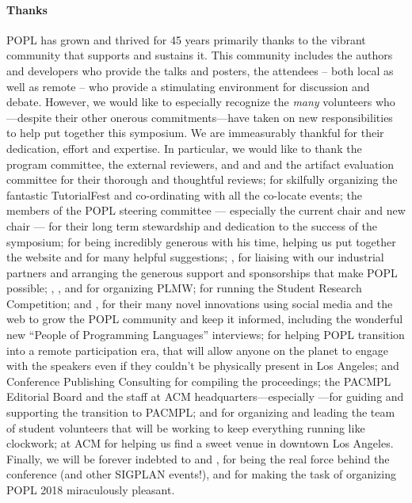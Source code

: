 \paragraph{Thanks}
%
POPL has grown and thrived for 45 years primarily thanks to
the vibrant community that supports and sustains it.
%
This community includes the authors and developers who
provide the talks and posters, the attendees -- both local
as well as remote -- who provide a stimulating environment
for discussion and debate.
%
However, we would like to especially recognize the \emph{many}
volunteers who---despite their other onerous commitments---have
taken on new responsibilities to help put together this symposium.
%
We are immeasurably thankful for their dedication, effort and expertise.
%
In particular, we would like to thank
%
the program committee, the external reviewers,
and  and 
and the artifact evaluation committee for their
thorough and thoughtful reviews;
%
 for skilfully organizing
the fantastic TutorialFest and co-ordinating with
all the co-locate events;
%
the members of the POPL steering committee --- especially the current
chair  and new chair  ---
for their long term stewardship and dedication to the success
of the symposium;
%
 for being incredibly generous with his time,
helping us put together the website and for many helpful
suggestions;
%
, for liaising with our industrial
partners and arranging the generous support and
sponsorships that make POPL possible;
%
, ,
 and 
for organizing PLMW;
%
 for running the Student Research Competition;
%
 and , for their many novel innovations
using social media and the web to grow the POPL community and
keep it informed, including the wonderful new ``People of Programming Languages''
interviews;
%
 for helping POPL transition into a remote participation
era, that will allow anyone on the planet to engage with the speakers even
if they couldn't be physically present in Los Angeles;
%
%
 and Conference Publishing Consulting
for compiling the proceedings;
%
the PACMPL Editorial Board and the staff at ACM
headquarters---especially ---for guiding
and supporting the transition to PACMPL;
%
 and  for organizing
and leading the team of student volunteers that will be
working to keep everything running like clockwork;
%
 at ACM for helping us find a sweet
venue in downtown Los Angeles.
%
Finally, we will be forever indebted to
 and ,
for being the real force behind the conference
(and other SIGPLAN events!), and for making the
task of organizing POPL 2018 miraculously pleasant.

